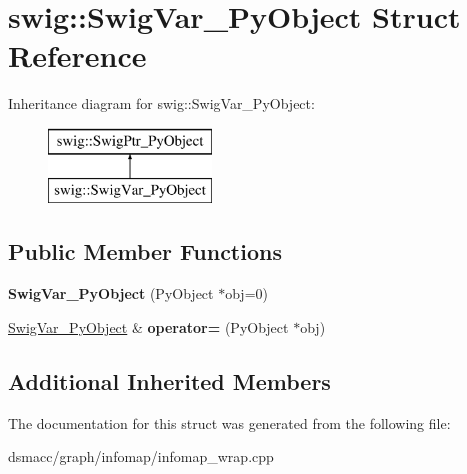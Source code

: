 \hypertarget{structswig_1_1SwigVar__PyObject}{}\section{swig\+:\+:Swig\+Var\+\_\+\+Py\+Object Struct Reference}
\label{structswig_1_1SwigVar__PyObject}
Inheritance diagram for swig\+:\+:Swig\+Var\+\_\+\+Py\+Object\+:\begin{figure}[H]
\begin{center}
\leavevmode
\includegraphics[height=2.000000cm]{structswig_1_1SwigVar__PyObject}
\end{center}
\end{figure}
\subsection*{Public Member Functions}
\begin{DoxyCompactItemize}
\item 
\mbox{\label{structswig_1_1SwigVar__PyObject_a2b61f843215bceaff8ec2ea6e92d46c2}} 
{\bfseries Swig\+Var\+\_\+\+Py\+Object} (Py\+Object $\ast$obj=0)
\item 
\mbox{\label{structswig_1_1SwigVar__PyObject_a7e6053b64cf6e787b99a67b09cdc6d89}} 
\mbox{\hyperlink{structswig_1_1SwigVar__PyObject}{Swig\+Var\+\_\+\+Py\+Object}} \& {\bfseries operator=} (Py\+Object $\ast$obj)
\end{DoxyCompactItemize}
\subsection*{Additional Inherited Members}


The documentation for this struct was generated from the following file\+:\begin{DoxyCompactItemize}
\item 
dsmacc/graph/infomap/infomap\+\_\+wrap.\+cpp\end{DoxyCompactItemize}
